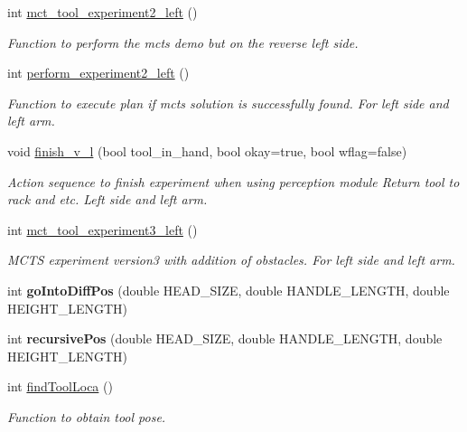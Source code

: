 \begin{DoxyCompactItemize}
int \hyperlink{structManipulate_a11da86aa5653ed4e4ddf1fe25a169a7a}{mct\+\_\+tool\+\_\+experiment2\+\_\+left} ()
\begin{DoxyCompactList}\small\item\em Function to perform the mcts demo but on the reverse left side. \end{DoxyCompactList}\item 
int \hyperlink{structManipulate_aa5bc40657d99cd3c92804a61925327cc}{perform\+\_\+experiment2\+\_\+left} ()
\begin{DoxyCompactList}\small\item\em Function to execute plan if mcts solution is successfully found. For left side and left arm. \end{DoxyCompactList}\item 
void \hyperlink{structManipulate_adedede8a7878a8065000f4bfff72b3b8}{finish\+\_\+v\+\_\+l} (bool tool\+\_\+in\+\_\+hand, bool okay=true, bool wflag=false)
\begin{DoxyCompactList}\small\item\em Action sequence to finish experiment when using perception module Return tool to rack and etc. Left side and left arm. \end{DoxyCompactList}\item 
int \hyperlink{structManipulate_a7b8394f3cd61252c79d9c1956e7aab2e}{mct\+\_\+tool\+\_\+experiment3\+\_\+left} ()
\begin{DoxyCompactList}\small\item\em M\+C\+TS experiment version3 with addition of obstacles. For left side and left arm. \end{DoxyCompactList}\item 
\mbox{\label{structManipulate_a9a93d24747a3e47c149914d52f533849}} 
int {\bfseries go\+Into\+Diff\+Pos} (double H\+E\+A\+D\+\_\+\+S\+I\+ZE, double H\+A\+N\+D\+L\+E\+\_\+\+L\+E\+N\+G\+TH, double H\+E\+I\+G\+H\+T\+\_\+\+L\+E\+N\+G\+TH)
\item 
\mbox{\label{structManipulate_a8de35e42067ef7574846cd86553ac463}} 
int {\bfseries recursive\+Pos} (double H\+E\+A\+D\+\_\+\+S\+I\+ZE, double H\+A\+N\+D\+L\+E\+\_\+\+L\+E\+N\+G\+TH, double H\+E\+I\+G\+H\+T\+\_\+\+L\+E\+N\+G\+TH)
\item 
int \hyperlink{structManipulate_a625fa2cac7d57ccc2e547461faf0a6e0}{find\+Tool\+Loca} ()
\begin{DoxyCompactList}\small\item\em Function to obtain tool pose. \end{DoxyCompactList}\item 

\end{DoxyCompactItemize}
